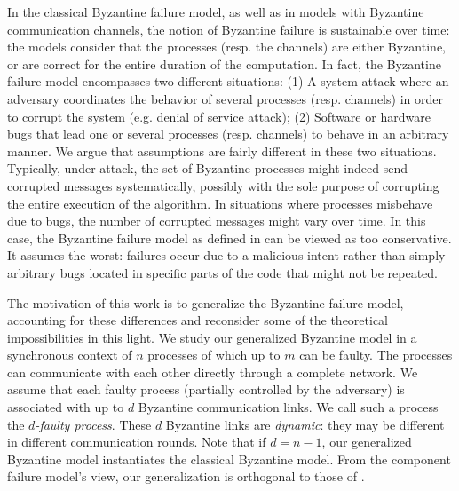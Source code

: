 \documentclass[11pt,letterpaper]{article}
\newcommand{\tmem}[1]{{\em #1\/}}
\begin{document}
In the classical Byzantine failure model, as well as in models with Byzantine communication channels, the notion of Byzantine failure is sustainable over time: the models consider that the processes (resp. the channels) are either Byzantine, or are correct for the entire duration of the computation. In fact, the Byzantine failure model encompasses two different situations: (1) A system attack where an adversary coordinates the behavior of several processes (resp. channels) in order to corrupt the system (e.g. denial of service attack); (2) Software or hardware bugs that lead one or several processes (resp. channels) to behave in an arbitrary manner.
We argue that
assumptions are fairly different in these two situations. Typically, under
attack, the set of Byzantine processes might indeed send corrupted messages systematically, possibly
with the sole purpose of corrupting the entire execution of the algorithm. In situations where processes misbehave due to bugs, the number of corrupted messages might vary over time. In this case, the Byzantine failure model as defined in \cite{lamport1982byzantine,pease1980reaching} can be viewed as too conservative. It assumes the worst: failures occur due to a malicious intent rather than simply arbitrary bugs located in specific parts of the code that might not be repeated.

The motivation of this work is to generalize the Byzantine failure model, accounting
for these differences and reconsider some of the theoretical impossibilities in
this light. We study our generalized Byzantine model in a synchronous context
of $n$
processes of which up to $m$ can be faulty. The processes can
communicate with each other directly through a complete network.
We assume that each faulty process (partially controlled by
the adversary) is associated with up to $d$ Byzantine communication
links. We call such a process the
{\tmem{$d$-faulty process}}.
These $d$ Byzantine links are \tmem{dynamic}: they may be
different in different communication rounds.
Note that if $d=n-1$, our generalized Byzantine model instantiates the classical Byzantine model. From the component failure model's view, our generalization is orthogonal to those of \cite{tseng2013iterative,santoro2007agreement,amitanand2003distributed}.
\end{document}
